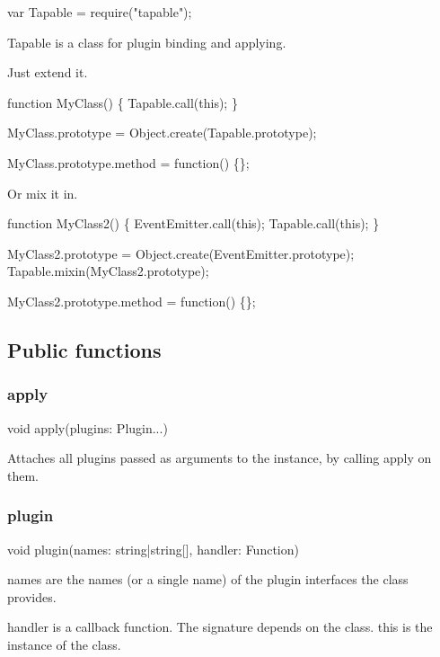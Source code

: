 
\begin{DoxyCode}
var Tapable = require("tapable");
\end{DoxyCode}


{\ttfamily Tapable} is a class for plugin binding and applying.

Just extend it.


\begin{DoxyCode}
function MyClass() \{
    Tapable.call(this);
\}

MyClass.prototype = Object.create(Tapable.prototype);

MyClass.prototype.method = function() \{\};
\end{DoxyCode}


Or mix it in.


\begin{DoxyCode}
function MyClass2() \{
    EventEmitter.call(this);
    Tapable.call(this);
\}

MyClass2.prototype = Object.create(EventEmitter.prototype);
Tapable.mixin(MyClass2.prototype);

MyClass2.prototype.method = function() \{\};
\end{DoxyCode}


\subsection*{Public functions}

\subsubsection*{apply}


\begin{DoxyCode}
void apply(plugins: Plugin...)
\end{DoxyCode}


Attaches all plugins passed as arguments to the instance, by calling {\ttfamily apply} on them.

\subsubsection*{plugin}


\begin{DoxyCode}
void plugin(names: string|string[], handler: Function)
\end{DoxyCode}


{\ttfamily names} are the names (or a single name) of the plugin interfaces the class provides.

{\ttfamily handler} is a callback function. The signature depends on the class. {\ttfamily this} is the instance of the class.

